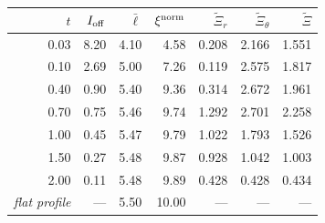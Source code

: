 \begin{tabular}{@{}rrrrrrr@{}}
\toprule
$t$ & $I_{\rm off}$ & $\bar\ell$ & $\xi^{\rm norm}$ & $\widetilde\Xi_r$ & $\widetilde\Xi_\theta$ & $\widetilde\Xi$ \\
\midrule
0.03 & 8.20 & 4.10 & 4.58 & 0.208 & 2.166 & 1.551 \\
0.10 & 2.69 & 5.00 & 7.26 & 0.119 & 2.575 & 1.817 \\
0.40 & 0.90 & 5.40 & 9.36 & 0.314 & 2.672 & 1.961 \\
0.70 & 0.75 & 5.46 & 9.74 & 1.292 & 2.701 & 2.258 \\
1.00 & 0.45 & 5.47 & 9.79 & 1.022 & 1.793 & 1.526 \\
1.50 & 0.27 & 5.48 & 9.87 & 0.928 & 1.042 & 1.003 \\
2.00 & 0.11 & 5.48 & 9.89 & 0.428 & 0.428 & 0.434 \\
\midrule
\emph{flat profile} & --- & 5.50 & 10.00 & --- & --- & --- \\
\bottomrule
\end{tabular}
